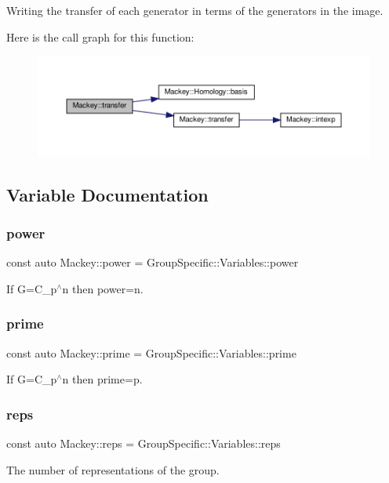 Writing the transfer of each generator in terms of the generators in the image. 

Here is the call graph for this function\+:\nopagebreak
\begin{figure}[H]
\begin{center}
\leavevmode
\includegraphics[width=350pt]{namespaceMackey_abd5b370902e8b53b32e3fd4e329f068d_cgraph}
\end{center}
\end{figure}


\subsection{Variable Documentation}
\mbox{\label{namespaceMackey_aafdaaabd06dd9ceefe6fa4f26d13a60d}} 
\subsubsection{\texorpdfstring{power}{power}}
{\footnotesize\ttfamily const auto Mackey\+::power = Group\+Specific\+::\+Variables\+::power}



If G=C\+\_\+p$^\wedge$n then power=n. 

\mbox{\label{namespaceMackey_a77e059c6f9b4c6ea096fcf94a7880bc3}} 
\subsubsection{\texorpdfstring{prime}{prime}}
{\footnotesize\ttfamily const auto Mackey\+::prime = Group\+Specific\+::\+Variables\+::prime}



If G=C\+\_\+p$^\wedge$n then prime=p. 

\mbox{\label{namespaceMackey_af282e8433677f2812cb242359f4cd0c1}} 
\subsubsection{\texorpdfstring{reps}{reps}}
{\footnotesize\ttfamily const auto Mackey\+::reps = Group\+Specific\+::\+Variables\+::reps}



The number of representations of the group. 

